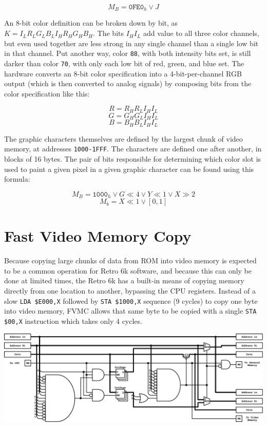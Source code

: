 \documentclass[12pt]{{memoir}}
\begin{document}
$$M_B = \texttt{0FE0}_h \vee J$$

An 8-bit color definition can be broken down by bit, as $K = I_LR_LG_LB_LI_HR_HG_HB_H$. The bits $I_HI_L$ add value to all three color channels, but even used together are less strong in any single channel than a single low bit in that channel. Put another way, color \texttt{88}, with both intensity bits set, is still darker than color \texttt{70}, with only each low bit of red, green, and blue set. The hardware converts an 8-bit color specification into a 4-bit-per-channel RGB output (which is then converted to analog signals) by composing bits from the color specification like this:

$$R = R_HR_LI_HI_L$$
$$G = G_HG_LI_HI_L$$
$$B = B_HB_LI_HI_L$$

The graphic characters themselves are defined by the largest chunk of video memory, at addresses \texttt{1000-1FFF}. The characters are defined one after another, in blocks of 16 bytes. The pair of bits responsible for determining which color slot is used to paint a given pixel in a given graphic character can be found using this formula:

$$M_B = \texttt{1000}_h \vee G \ll 4 \vee Y \ll 1 \vee X \gg 2$$
$$M_b = X \ll 1 \vee [0,1]$$

\section{Fast Video Memory Copy}
\label{sec:fvmc}

Because copying large chunks of data from ROM into video memory is expected to be a common operation for Retro 6k software, and because this can only be done at limited times, the Retro 6k has a built-in means of copying memory directly from one location to another, bypassing the CPU registers. Instead of a slow \texttt{LDA \$E000,X} followed by \texttt{STA \$1000,X} sequence (9 cycles) to copy one byte into video memory, FVMC allows that same byte to be copied with a single \texttt{STA \$00,X} instruction which takes only 4 cycles.

\begin{center}\includegraphics[width=\textwidth]{fvmc}\end{center}
\end{document}
